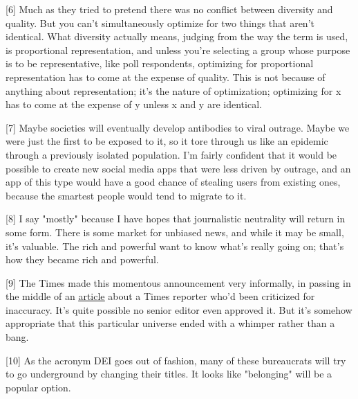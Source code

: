 [6] Much as they tried to pretend there was no conflict between
                  diversity and quality. But you can't simultaneously optimize
                  for two things that aren't identical. What diversity actually
                  means, judging from the way the term is used, is proportional
                  representation, and unless you're selecting a group whose
                  purpose is to be representative, like poll respondents,
                  optimizing for proportional representation has to come at the
                  expense of quality. This is not because of anything about
                  representation; it's the nature of optimization; optimizing
                  for x has to come at the expense of y unless x and y are
                  identical.

[7] Maybe societies will eventually develop antibodies to viral
                  outrage. Maybe we were just the first to be exposed to it, so
                  it tore through us like an epidemic through a previously
                  isolated population. I'm fairly confident that it would be
                  possible to create new social media apps that were less driven
                  by outrage, and an app of this type would have a good chance
                  of stealing users from existing ones, because the smartest
                  people would tend to migrate to it.

[8] I say "mostly" because I have hopes that journalistic
                  neutrality will return in some form. There is some market for
                  unbiased news, and while it may be small, it's valuable. The
                  rich and powerful want to know what's really going on; that's
                  how they became rich and powerful.

[9] The Times made this momentous announcement very informally,
                  in passing in the middle of an
                  \href{https://www.nytimes.com/2020/10/11/business/media/new-york-times-rukmini-callimachi-caliphate.html}{\underline{article}}
                  about a Times reporter who'd been criticized for inaccuracy.
                  It's quite possible no senior editor even approved it. But
                  it's somehow appropriate that this particular universe ended
                  with a whimper rather than a bang.

[10] As the acronym DEI goes out of fashion, many of these
                  bureaucrats will try to go underground by changing their
                  titles. It looks like "belonging" will be a popular option.

